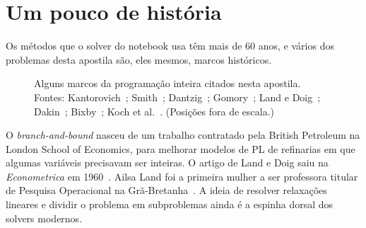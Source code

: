 \section{Um pouco de história}

Os métodos que o solver do notebook usa têm mais de 60 anos, e vários dos problemas desta apostila são, eles
mesmos, marcos históricos.

\begin{figure}[H]
\centering
{}
\caption{Alguns marcos da programação inteira citados nesta apostila. Fontes: Kantorovich~\cite{kantorovich1960};
Smith~\cite{smith1956}; Dantzig~\cite{dantzig1957}; Gomory~\cite{gomory1958}; Land e Doig~\cite{landdoig1960};
Dakin~\cite{dakin1965}; Bixby~\cite{bixby2012}; Koch et al.~\cite{koch2022}. (Posições fora de escala.)}
\label{fig:historia}
\end{figure}

\begin{outros}
O \emph{branch-and-bound} nasceu de um trabalho contratado pela British Petroleum na London School of Economics, para
melhorar modelos de PL de refinarias em que algumas variáveis precisavam ser inteiras. O artigo de Land e Doig saiu
na \emph{Econometrica} em 1960~\cite{landdoig1960}. Ailsa Land foi a primeira mulher a ser professora titular de
Pesquisa Operacional na Grã-Bretanha~\cite{informsland}. A ideia de resolver relaxações lineares e dividir o problema
em subproblemas ainda é a espinha dorsal dos solvers modernos.
\end{outros}

